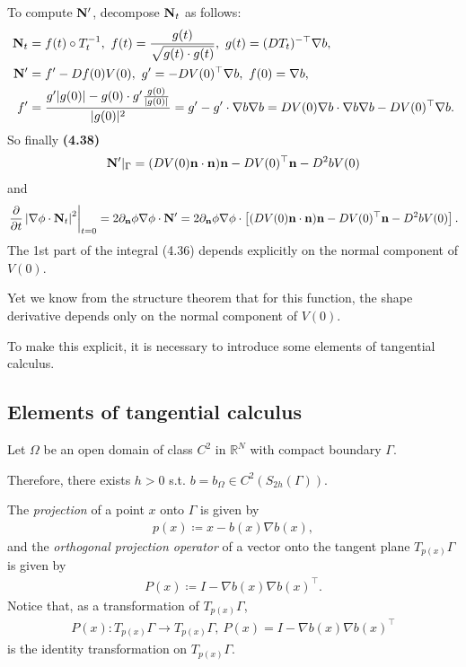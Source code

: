 \documentclass[oneside]{book}
\numberwithin{equation}{section}
\begin{document}
To compute ${\bf N}'$, decompose ${\bf N}_t$ as follows:
\begin{align*}
    {\bf N}_t &= f(t)\circ T_t^{-1},\ f(t) = \frac{g(t)}{\sqrt{g(t)\cdot g(t)}},\ g(t) = (DT_t)^{-\top}\nabla b,\\
    {\bf N}' &= f' - Df(0)V(0),\ g' = -DV(0)^\top\nabla b,\ f(0) = \nabla b,\\
    f' &= \frac{g'|g(0)| - g(0)\cdot g'\frac{g(0)}{|g(0)|}}{|g(0)|^2} = g' - g'\cdot\nabla b\nabla b = DV(0)\nabla b\cdot\nabla b\nabla b - DV(0)^\top\nabla b.
\end{align*}
So finally \textbf{(4.38)}
\begin{align*}
    {\bf N}'|_\Gamma = (DV(0){\bf n}\cdot{\bf n}){\bf n} - DV(0)^\top{\bf n} - D^2bV(0)
\end{align*}
and
\begin{align*}
    \left.\frac{\partial}{\partial t}\left|\nabla\phi\cdot{\bf N}_t\right|^2\right|_{t = 0} = 2\partial_{\bf n}\phi\nabla\phi\cdot{\bf N}' = 2\partial_{\bf n}\phi\nabla\phi\cdot\left[(DV(0){\bf n}\cdot{\bf n}){\bf n} - DV(0)^\top{\bf n} - D^2bV(0)\right].
\end{align*}
The 1st part of the integral (4.36) depends explicitly on the normal component of $V(0)$.

Yet we know from the structure theorem that for this function, the shape derivative depends only on the normal component of $V(0)$.

To make this explicit, it is necessary to introduce some elements of tangential calculus.

\subsection{Elements of tangential calculus}
Let $\Omega$ be an open domain of class $C^2$ in $\mathbb{R}^N$ with compact boundary $\Gamma$.

Therefore, there exists $h > 0$ s.t. $b = b_\Omega\in C^2(S_{2h}(\Gamma))$.

The \textit{projection} of a point $x$ onto $\Gamma$ is given by
\begin{align*}
    p(x)\coloneqq x - b(x)\nabla b(x),
\end{align*}
and the \textit{orthogonal projection operator} of a vector onto the tangent plane $T_{p(x)}\Gamma$ is given by
\begin{align*}
    P(x)\coloneqq I - \nabla b(x)\nabla b(x)^\top.
\end{align*}
Notice that, as a transformation of $T_{p(x)}\Gamma$,
\begin{align*}
    P(x):T_{p(x)}\Gamma\to T_{p(x)}\Gamma,\ P(x) = I - \nabla b(x)\nabla b(x)^\top
\end{align*}
is the identity transformation on $T_{p(x)}\Gamma$.
\end{document}
